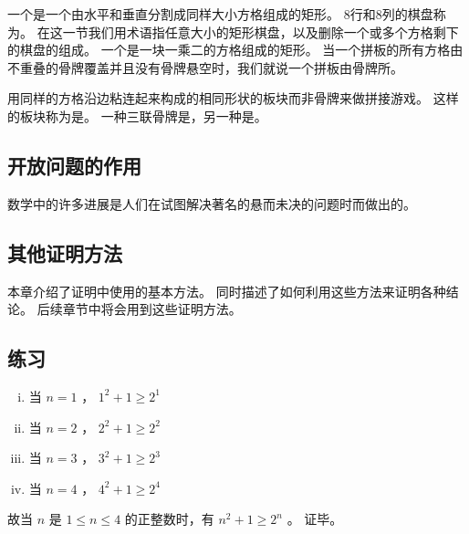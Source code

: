 {{        一个是一个由水平和垂直分割成同样大小方格组成的矩形。
        8行和8列的棋盘称为。
        在这一节我们用术语指任意大小的矩形棋盘，以及删除一个或多个方格剩下的棋盘的组成。
        一个是一块一乘二的方格组成的矩形。
        当一个拼板的所有方格由不重叠的骨牌覆盖并且没有骨牌悬空时，我们就说一个拼板由骨牌所。

        用同样的方格沿边粘连起来构成的相同形状的板块而非骨牌来做拼接游戏。
        这样的板块称为是。
        一种三联骨牌是，另一种是。
    }

    \subsection{开放问题的作用}
    {
        数学中的许多进展是人们在试图解决著名的悬而未决的问题时而做出的。
    }

    \subsection{其他证明方法}
    {
        本章介绍了证明中使用的基本方法。
        同时描述了如何利用这些方法来证明各种结论。
        后续章节中将会用到这些证明方法。
    }

    \subsection{练习}
    {
        \begin{practices}
            \begin{enumerate}[i.]
                \item 当 $n = 1$ ， $1^2 + 1 \geq 2^1$
                \item 当 $n = 2$ ， $2^2 + 1 \geq 2^2$
                \item 当 $n = 3$ ， $3^2 + 1 \geq 2^3$
                \item 当 $n = 4$ ， $4^2 + 1 \geq 2^4$
            \end{enumerate}

            故当 $n$ 是 $1 \leq n \leq 4$ 的正整数时，有 $n^2 + 1 \geq 2^n$ 。
            证毕。
        \end{practices}

}}
